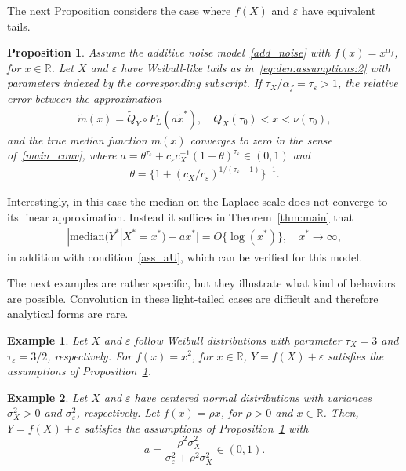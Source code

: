 \documentclass{statsoc}
\newtheorem{proposition}{Proposition}
\newtheorem{example}{Example}
\theoremstyle{break}
\newcommand{\eps}{\varepsilon}
\newcommand{\tauzero}{\tau_0}
\def\M{\text{median}}
\newcommand{\beao}{\begin{eqnarray*}}
\newcommand{\eeao}{\end{eqnarray*}\noindent}
\begin{document}
The next Proposition considers the case where $f(X)$ and $\varepsilon$ have equivalent tails.


\begin{proposition}\label{prop:weibull:light:tails}
	Assume the additive noise model~\eqref{add_noise} with $f(x) = x^{\alpha_f}$, for $x \in \mathbb R$.
	Let $X$ and $\varepsilon$ have Weibull-like tails as in~\eqref{eq:den:assumptions:2} with parameters indexed by the corresponding subscript. If $\tau_X/\alpha_f = \tau_\eps > 1$,
	the relative error between the approximation 
	\begin{align*} 
	\tilde m(x) =  
	\tilde Q_Y \circ F_L(a\tilde x^*), \quad Q_X(\tauzero) <  x < \nu(\tauzero),
	\end{align*}
	and the true median function $m(x)$ converges to zero in the sense of~\eqref{main_conv}, where $a = \theta^{\tau_\eps} +  c_{\varepsilon} c_X^{-1}  (1-\theta)^{\tau_\eps} \in (0,1)$ and  
	\beao 
	\theta = \{1 + (c_X/c_\eps)^{1/(\tau_\eps - 1)}\}^{-1}.
	\eeao
\end{proposition}
Interestingly, in this case the median on the Laplace scale does not converge to its linear approximation. Instead it suffices in Theorem~\ref{thm:main} that    
\begin{align}\label{eq:median:result}
	|\M(Y^* | X^* = x^*) - a x^*| = O\{ \log(x^*)\}, \quad x^* \to\infty,
\end{align} 
in addition with condition~\eqref{ass_aU}, which can be verified for this model.


The next examples are rather specific, but they illustrate what kind of behaviors are possible. Convolution in these light-tailed cases are difficult and therefore analytical forms are rare.   



\begin{example}
Let $X$ and $\varepsilon$ follow Weibull distributions with parameter $\tau_X = 3$ and $\tau_\varepsilon = 3/2$, respectively. 
For $f(x) = x^2$, for $x \in\mathbb R$, $Y= f(X) + \varepsilon$ satisfies the assumptions of Proposition~\ref{prop:weibull:light:tails}. 
\end{example}


\begin{example}\label{examples:gaussian:copula}
	Let $X$ and $\varepsilon$ have centered normal distributions with variances $\sigma_X^2 > 0$ and $\sigma_\varepsilon^2$, respectively.
		Let $f(x) = \rho x$, for $\rho > 0$ and $x \in \mathbb{R}$. Then, $Y= f(X) + \varepsilon$ satisfies the assumptions of Proposition~\ref{prop:weibull:light:tails} with
	\[a = \frac{\rho^2\sigma_X^2}{\sigma_\varepsilon^2  +\rho^2\sigma_X^2} \in (0,1).\] 
\end{example}
\end{document}
